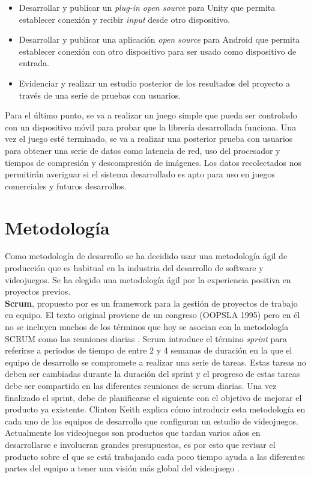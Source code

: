 \begin {itemize}
\item Desarrollar y publicar un \textit{plug-in open source} para Unity que permita establecer conexi\'on y recibir \textit{input} desde otro dispositivo.
\item Desarrollar y publicar una aplicaci\'on \textit{open source} para Android que permita establecer conexi\'on con otro dispositivo para ser usado como dispositivo de entrada.
\item Evidenciar y realizar un estudio posterior de los resultados del proyecto a trav\'es de una serie de pruebas con usuarios. 
\end {itemize}

Para el \'ultimo punto, se va a realizar un juego simple que pueda ser controlado con un dispositivo m\'ovil para probar que la librer\'ia desarrollada funciona. Una vez el juego est\'e terminado, se va a realizar una posterior prueba con usuarios para obtener una serie de datos como latencia de red, uso del procesador y tiempos de compresi\'on y descompresi\'on de im\'agenes. Los datos recolectados nos permitir\'an averiguar si el sistema desarrollado es apto para uso en juegos comerciales y futuros desarrollos.

\section{Metodolog\'ia}

Como metodolog\'ia de desarrollo se ha decidido usar una metodolog\'ia \'agil de producci\'on que es habitual en la industria del desarrollo de software y videojuegos. Se ha elegido una metodolog\'ia \'agil por la experiencia positiva en proyectos previos.\\

\textbf{Scrum}, propuesto por \citep{scrum} es un framework para la gesti\'on de proyectos de trabajo en equipo. El texto original proviene de un congreso (OOPSLA 1995) pero en \'el no se incluyen muchos de los t\'erminos que hoy se asocian con la metodolog\'ia SCRUM como las reuniones diarias \citep{scrum2}. Scrum introduce el t\'ermino \textit{sprint} para referirse a periodos de tiempo de entre 2 y 4 semanas de duraci\'on en la que el equipo de desarrollo se compromete a realizar una serie de tareas. Estas tareas no deben ser cambiadas durante la duraci\'on del sprint y el progreso de estas tareas debe ser compartido en las diferentes reuniones de scrum diarias. Una vez finalizado el sprint, debe de planificarse el siguiente con el objetivo de mejorar el producto ya existente. Clinton Keith explica c\'omo introducir esta metodolog\'ia en cada uno de los equipos de desarrollo que configuran un estudio de videojuegos. Actualmente los videojuegos son productos que tardan varios a\~nos en desarrollarse e involucran grandes presupuestos, es por esto que revisar el producto sobre el que se est\'a trabajando cada poco tiempo ayuda a las diferentes partes del equipo a tener una visi\'on m\'as global del videojuego \citep{keith2010agile}.  \\

